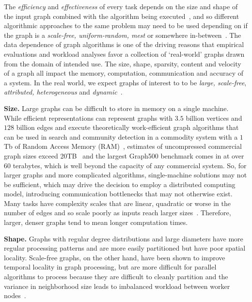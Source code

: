 The \textit{efficiency} and \textit{effectiveness} of every \gai task depends on the size and shape of the input graph combined with the algorithm being executed~\cite{Fu2014, Osama2022}, and so different algorithmic approaches to the same problem may need to be used depending on if the graph is a \textit{scale-free, uniform-random, mest} or somewhere in-between~\cite{Lenharth2016}.
The data dependence of graph algorithms is one of the driving reasons that empirical evaluations and workload analyses favor a collection of `real-world' graphs drawn from the domain of intended use.
The size, shape, sparsity, content and velocity of a graph all impact the memory, computation, communication and accuracy of a system.
In the real world, we expect graphs of interest to \gai to be \textit{large, scale-free}, \textit{attributed, heterogeneous} and \textit{dynamic}~\cite{Regli2022a}.

\textbf{Size.}
Large graphs can be difficult to store in memory on a single machine. 
While efficient representations can represent graphs with $3.5$ billion vertices and $128$ billion edges and execute theoretically work-efficient graph algorithms that can be used in search and community detection in a commodity system with a $1$Tb of Random Access Memory (RAM)~\cite{Dhulipala2018}, estimates of uncompressed commercial graph sizes exceed 20TB~\cite{Aananthakrishnan2020} and the largest Graph500 benchmark comes in at over $60$ terabytes, which is well beyond the capacity of any commercial system. 
So, for larger graphs and more complicated algorithms, single-machine solutions may not be sufficient, which may drive the decision to employ a distributed computing model, introducing communication bottlenecks that may not otherwise exist. 
Many \gai tasks have complexity scales that are linear, quadratic or worse in the number of edges and so scale poorly as inputs reach larger sizes~\cite{Hong2012}.
Therefore, larger, denser graphs tend to mean longer computation times. 

\textbf{Shape.}
Graphs with regular degree distributions and large diameters have more regular processing patterns and are more easily partitioned but have poor spatial locality.
Scale-free graphs, on the other hand, have been shown to improve temporal locality in graph processing, but are more difficult for parallel algorithms to process because they are difficult to cleanly partition and the variance in neighborhood size leads to imbalanced workload between worker nodes~\cite{Beamer2015}.

